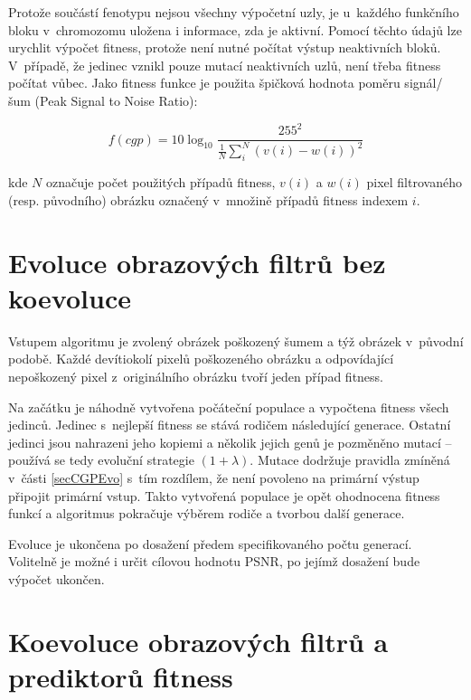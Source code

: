 Protože součástí fenotypu nejsou všechny výpočetní uzly, je u~každého funkčního bloku v~chromozomu uložena i informace, zda je aktivní. Pomocí těchto údajů lze urychlit výpočet fitness, protože není nutné počítat výstup neaktivních bloků. V~případě, že jedinec vznikl pouze mutací neaktivních uzlů, není třeba fitness počítat vůbec. Jako fitness funkce je použita špičková hodnota poměru signál/šum (Peak Signal to Noise Ratio):

\begin{equation}
    \label{eqDesignFilterFitness}
    \mathit{f\left(cgp\right)} = 10 \log_{10} \frac{255^2}{\frac{1}{N} \sum\limits_i^N \left( v\left( i \right) - w\left( i \right)  \right)^2 }
\end{equation}

\noindent{}kde $N$ označuje počet použitých případů fitness, $v(i)$ a $w(i)$ pixel filtrovaného (resp. původního) obrázku označený v~množině případů fitness indexem $i$.

\section{Evoluce obrazových filtrů bez koevoluce}
\label{secDesignEvoSimple}

Vstupem algoritmu je zvolený obrázek poškozený šumem a týž obrázek v~původní podobě. Každé devítiokolí pixelů poškozeného obrázku a odpovídající nepoškozený pixel z~originálního obrázku tvoří jeden případ fitness.

Na začátku je náhodně vytvořena počáteční populace a vypočtena fitness všech jedinců. Jedinec s~nejlepší fitness se stává rodičem následující generace. Ostatní jedinci jsou nahrazeni jeho kopiemi a několik jejich genů je pozměněno mutací -- používá se tedy evoluční strategie $(1 + \lambda)$. Mutace dodržuje pravidla zmíněná v~části \ref{secCGPEvo} s~tím rozdílem, že není povoleno na primární výstup připojit primární vstup. Takto vytvořená populace je opět ohodnocena fitness funkcí a algoritmus pokračuje výběrem rodiče a tvorbou další generace.

Evoluce je ukončena po dosažení předem specifikovaného počtu generací. Volitelně je možné i určit cílovou hodnotu PSNR, po jejímž dosažení bude výpočet ukončen.

\section{Koevoluce obrazových filtrů a prediktorů fitness}
\label{secDesignCoev}

